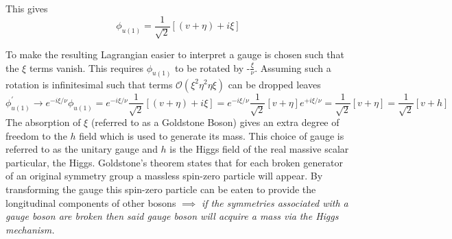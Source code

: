 This gives
\begin{equation}
  \phi_{u(1)} = \frac{1}{\sqrt{2}}[(v+\eta) + i\xi]
  \end{equation}


To make the resulting Lagrangian easier to interpret a gauge is chosen such that the $\xi$ terms vanish.  This requires $\phi_{u(1)}$ to be rotated by -$\frac{\xi}{\nu}$. Assuming such a rotation is infinitesimal such that terms $\mathcal{O}(\xi^{2}\eta^{2}\eta\xi)$ can be dropped leaves
\begin{equation}
  \phi^{'}_{u(1)} \to e^{-i\xi/\nu}\phi_{u(1)}  = e^{-i\xi/\nu}\frac{1}{\sqrt{2}}[(v+\eta) + i\xi] = e^{-i\xi/\nu}\frac{1}{\sqrt{2}}[v+\eta]e^{+i\xi/\nu} = \frac{1}{\sqrt{2}}[v+\eta] =\frac{1}{\sqrt{2}}[v+h]
\end{equation}
The absorption of $\xi$ (referred to as a Goldstone Boson) gives an extra degree of freedom to the $h$ field which is used to generate its mass. This choice of gauge is referred to as the unitary gauge and $h$ is the Higgs field of the real massive scalar particular, the Higgs. Goldstone's theorem states that for each broken generator of an original symmetry group a massless spin-zero particle will appear. By transforming the gauge this spin-zero particle can be eaten to provide the longitudinal components of other bosons $\implies$ \emph{if the symmetries associated with a gauge boson are broken then said gauge boson will acquire a mass via the Higgs mechanism.} 
